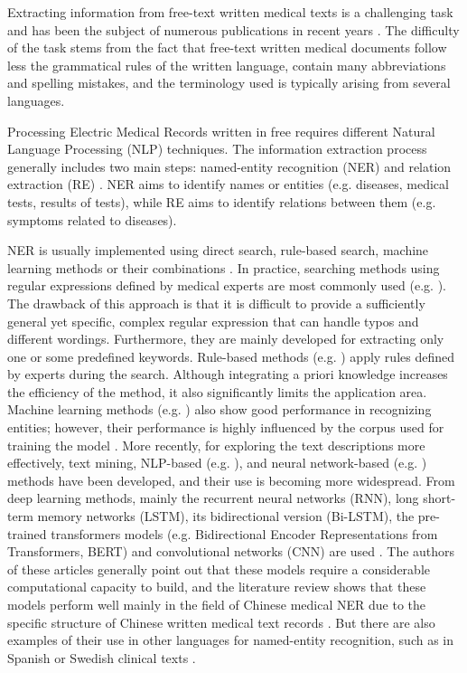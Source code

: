 Extracting information from free-text written medical texts is a challenging task and has been the subject of numerous publications in recent years \cite{lopez2020covid, wu2020attention, wang2020prediction, slater2021fast, kraljevic2021multi, percha2021modern}. The difficulty of the task stems from the fact that free-text written medical documents follow less the grammatical rules of the written language, contain many abbreviations and spelling mistakes, and the terminology used is typically arising from several languages.

Processing Electric Medical Records written in free requires different Natural Language Processing (NLP) techniques. The information extraction process generally includes two main steps: named-entity recognition (NER) and relation extraction (RE) \cite{sun2018data}. NER aims to identify names or entities (e.g. diseases, medical tests, results of tests), while RE aims to identify relations between them (e.g. symptoms related to diseases).

NER is usually implemented using direct search, rule-based search, machine learning methods or their combinations \cite{grishman1996message}. In practice, searching methods using regular expressions defined by medical experts are most commonly used (e.g. \cite{cohen2019accuracy, fu2020extracting}). The drawback of this approach is that it is difficult to provide a sufficiently general yet specific, complex regular expression that can handle typos and different wordings. Furthermore, they are mainly developed for extracting only one or some predefined keywords. Rule-based methods (e.g. \cite{sahu2018rule, almeida2020rule}) apply rules defined by experts during the search. Although integrating a priori knowledge increases the efficiency of the method, it also significantly limits the application area. Machine learning methods (e.g. \cite{bao2019machine, spasic2020clinical}) also show good performance in recognizing entities; however, their performance is highly influenced by the corpus used for training the model \cite{kormilitzin2021med7}. More recently, for exploring the text descriptions more effectively, text mining, NLP-based (e.g. \cite{carchiolo2019medical, chilman2021text, viani2021natural}), and neural network-based (e.g. \cite{yang2019information, zhu2021utilizing}) methods have been developed, and their use is becoming more widespread. From deep learning methods, mainly the recurrent neural networks (RNN), long short-term memory networks (LSTM), its bidirectional version (Bi-LSTM), the pre-trained transformers models (e.g. Bidirectional Encoder Representations from Transformers, BERT) and convolutional networks (CNN) are used \cite{li2022entity, zhang2022medical}. The authors of these articles generally point out that these models require a considerable computational capacity to build, and the literature review shows that these models perform well mainly in the field of Chinese medical NER due to the specific structure of Chinese written medical text records \cite{chen2022named}. But there are also examples of their use in other languages for named-entity recognition, such as in Spanish or Swedish clinical texts \cite{weegar2019recent}.
 
